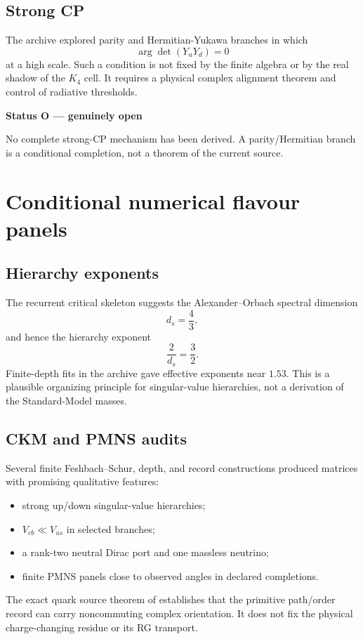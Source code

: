 \documentclass[11pt,oneside,openany]{book}
\numberwithin{equation}{chapter}
\theoremstyle{definition}
\theoremstyle{remark}
\newenvironment{statusbox}[2]{%
  \par\medskip\noindent
  \begin{center}\begin{minipage}{0.94\textwidth}
  \colorbox{#1!8}{\parbox{\dimexpr\linewidth-2\fboxsep\relax}{\textbf{#2}}}\par\smallskip
}{%
  \end{minipage}\end{center}\medskip
}
\newcommand{\Open}[1]{\begin{statusbox}{OpenColor}{Status O --- genuinely open}#1\end{statusbox}}
\begin{document}
\section{Strong CP}
The archive explored parity and Hermitian-Yukawa branches in which
\[
 \arg\det(Y_uY_d)=0
\]
at a high scale.  Such a condition is not fixed by the finite algebra or by the real shadow of the $K_4$ cell.  It requires a physical complex alignment theorem and control of radiative thresholds.

\Open{No complete strong-CP mechanism has been derived.  A parity/Hermitian branch is a conditional completion, not a theorem of the current source.}

\chapter{Conditional numerical flavour panels}
\label{ch:phenom-flavour}

\section{Hierarchy exponents}
The recurrent critical skeleton suggests the Alexander--Orbach spectral dimension
\[
 d_s=\frac43,
\]
and hence the hierarchy exponent
\[
 \frac{2}{d_s}=\frac32.
\]
Finite-depth fits in the archive gave effective exponents near $1.53$.  This is a plausible organizing principle for singular-value hierarchies, not a derivation of the Standard-Model masses.

\section{CKM and PMNS audits}
Several finite Feshbach--Schur, depth, and record constructions produced matrices with promising qualitative features:
\begin{itemize}[leftmargin=2em]
\item strong up/down singular-value hierarchies;
\item $V_{cb}\ll V_{us}$ in selected branches;
\item a rank-two neutral Dirac port and one massless neutrino;
\item finite PMNS panels close to observed angles in declared completions.
\end{itemize}
The exact quark source theorem of  establishes that the primitive path/order record can carry noncommuting complex orientation.  It does not fix the physical charge-changing residue or its RG transport.
\end{document}

